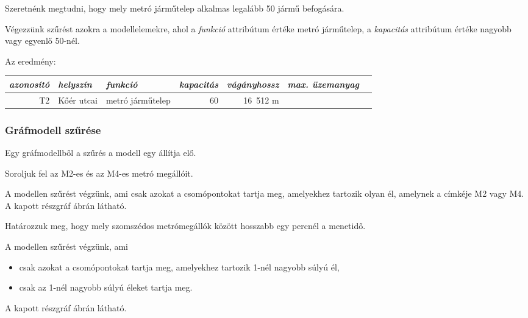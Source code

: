 \begin{pelda}
	Szeretnénk megtudni, hogy mely metró járműtelep alkalmas legalább 50 jármű befogására.
\end{pelda}

Végezzünk szűrést azokra a modellelemekre, ahol a \textit{funkció} attribútum értéke \textsf{metró járműtelep}, a \textit{kapacitás} attribútum értéke nagyobb vagy egyenlő 50-nél.

Az eredmény:
\begin{table}[H]
	\sf
	\centering
	\begin{tabular}{rllrrrr}
		\toprule
		\it azonosító & \it helyszín & \it funkció      & \it kapacitás & \it vágányhossz & \it max. üzemanyag &  \\ \midrule
		T2 & Kőér utcai   & metró járműtelep &            60 &        16~512 m &                    &  \\
		\bottomrule
	\end{tabular}
\end{table}

\subsubsection{Gráfmodell szűrése}

Egy gráfmodellből a szűrés a modell egy  állítja elő.

\begin{pelda}
	Soroljuk fel az M2-es és az M4-es metró megállóit.
\end{pelda}

A modellen szűrést végzünk, ami csak azokat a csomópontokat tartja meg, amelyekhez tartozik olyan él, amelynek a címkéje M2 vagy M4. A kapott részgráf  ábrán látható.

\begin{pelda}
	Határozzuk meg, hogy mely szomszédos metrómegállók között hosszabb egy percnél a menetidő.	
\end{pelda}

A modellen szűrést végzünk, ami

\begin{itemize}
	\item csak azokat a csomópontokat tartja meg, amelyekhez tartozik 1-nél nagyobb súlyú él,
	\item csak az 1-nél nagyobb súlyú éleket tartja meg.
\end{itemize}

A kapott részgráf  ábrán látható.


